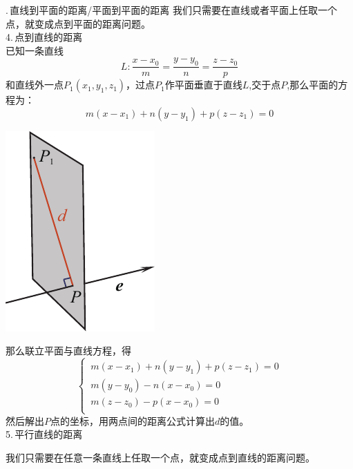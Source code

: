 \noindent
\begin{minipage}{0.7\linewidth}.$\,$直线到平面的距离/平面到平面的距离
	\hspace*{2em} 我们只需要在直线或者平面上任取一个点，就变成点到平面的距离问题。\\
	4.$\,$点到直线的距离
 \\ \hspace*{2em} 已知一条直线
\begin{equation}
	L:\frac{x-x_0}{m}=\frac{y-y_0}{n}=\frac{z-z_0}{p}
\end{equation}
和直线外一点$P_1(x_1,y_1,z_1)$，过点$P_1$作平面垂直于直线$L$,交于点$P$,那么平面的方程为：
\begin{equation}
	m(x-x_1)+n(y-y_1)+p(z-z_1)=0
\end{equation}
\end{minipage}
\begin{minipage}{0.4\linewidth}
	\centering
	\includegraphics[width = 0.5\linewidth]{pic/C-5/linepd}
	\vspace*{-1em}
	\label{点到空间直线的距离}
\end{minipage}

\vspace*{0.5em}
\noindent 那么联立平面与直线方程，得
\begin{equation}
	\begin{cases}
		\, m(x-x_1)+n(y-y_1)+p(z-z_1)=0\\
		\, m(y-y_0)-n(x-x_0)=0\\
		\, m(z-z_0)-p(x-x_0)=0\\
	\end{cases}
\end{equation}
然后解出$P$点的坐标，用两点间的距离公式计算出$d$的值。
\\ 5.$\,$平行直线的距离
\par 我们只需要在任意一条直线上任取一个点，就变成点到直线的距离问题。
